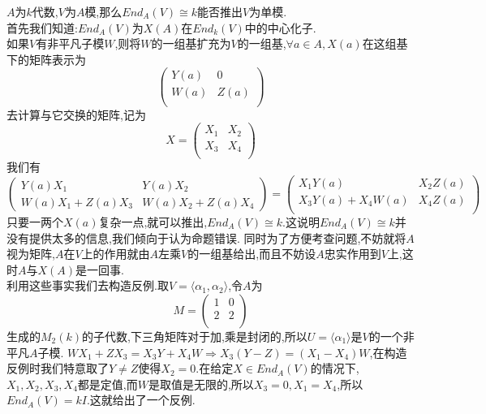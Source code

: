 \documentclass[b5paper]{ctexart}
\begin{document}
\pagestyle{plain}
\noindent
{}
$A$为$k$代数,$V$为$A$模,那么$End_A(V)\cong k$能否推出$V$为单模.\\
首先我们知道:$End_A(V)$为$X(A)$在$End_k(V)$中的中心化子.\\
如果$V$有非平凡子模$W$,则将$W$的一组基扩充为$V$的一组基,$\forall a\in A,X(a)$在这组基下的矩阵表示为
\[\left( \begin{array}{cc}
{Y}(a) & {0}\\
{W}(a) & Z(a)\\
\end{array}\right) \]  
去计算与它交换的矩阵,记为
\[X=\left( \begin{array}{cc}
X_1 & X_2\\
X_3 & X_4\\
\end{array}\right) 
\]
我们有
\[
\left( \begin{array}{cc}
Y(a)X_1  & Y(a)X_2\\
W(a)X_1+Z(a)X_3 & W(a)X_2+Z(a)X_4
\end{array}\right)=\left( \begin{array}{cc}
X_1Y(a) & X_2Z(a)\\
X_3Y(a)+X_4W(a) & X_4Z(a)\\
\end{array}\right)  \]
只要一两个$X(a)$复杂一点,就可以推出,$End_A(V)\cong k$.这说明$End_A(V)\cong k$并没有提供太多的信息,我们倾向于认为命题错误.
同时为了方便考查问题,不妨就将$A$视为矩阵,$A$在$V$上的作用就由$A$左乘$V$的一组基给出,而且不妨设$A$忠实作用到$V$上,这时$A$与$X(A)$是一回事.\\
利用这些事实我们去构造反例.取$V=\langle \alpha_1,\alpha_2\rangle$,令$A$为
\[
M=\left( \begin{array}{cc}
1 & 0\\
2 & 2\\
\end{array}\right) \]
生成的$M_2(k)$的子代数,下三角矩阵对于加,乘是封闭的,所以$U=\langle\alpha_1\rangle$是$V$的一个非平凡$A$子模.
$WX_1+ZX_3=X_3Y+X_4W\Rightarrow X_3(Y-Z)=(X_1-X_4)W$,在构造反例时我们特意取了$Y\neq Z$使得$X_2=0$.在给定$X\in End_A(V)$的情况下,$X_1,X_2,X_3,X_4$都是定值,而$W$是取值是无限的,所以$X_3=0,X_1=X_4$,所以$End_A(V)=kI$.这就给出了一个反例.
\end{document}

